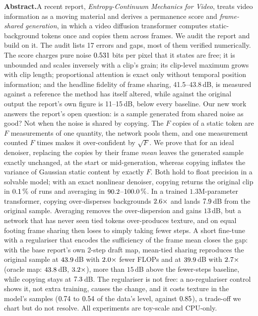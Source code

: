 \noindent\textbf{Abstract.}\hspace{0.4em}A recent report, \emph{Entropy-Continuum Mechanics for Video}, treats video information as a moving material and derives a permanence score and \emph{frame-shared generation}, in which a video diffusion transformer computes static-background tokens once and copies them across frames.
We audit the report and build on it.
The audit lists 17 errors and gaps, most of them verified numerically.
The score charges pure noise $0.531$ bits per pixel that it states are free; it is unbounded and scales inversely with a clip's grain; its clip-level maximum grows with clip length; proportional attention is exact only without temporal position information; and the headline fidelity of frame sharing, 41.5--43.8\,dB, is measured against a reference the method has itself altered, while against the original output the report's own figure is 11--15\,dB, below every baseline.
Our new work answers the report's open question: is a sample generated from shared noise as good?
Not when the noise is shared by copying.
The $F$ copies of a static token are $F$ measurements of one quantity, the network pools them, and one measurement counted $F$ times makes it over-confident by $\sqrt F$.
We prove that for an ideal denoiser, replacing the copies by their frame \emph{mean} leaves the generated sample exactly unchanged, at the start or mid-generation, whereas copying inflates the variance of Gaussian static content by exactly $F$.
Both hold to float precision in a solvable model; with an exact nonlinear denoiser, copying returns the original clip in $0.1\,\%$ of runs and averaging in $90.2$--$100.0\,\%$.
In a trained $1.3$M-parameter transformer, copying over-disperses backgrounds $2.6\times$ and lands $7.9$\,dB from the original sample.
Averaging removes the over-dispersion and gains $13$\,dB, but a network that has never seen tied tokens over-produces texture, and on equal footing frame sharing then loses to simply taking fewer steps.
A short fine-tune with a regulariser that encodes the sufficiency of the frame mean closes the gap: with the base report's own 2-step draft map, mean-tied sharing reproduces the original sample at $43.9$\,dB with $2.0\times$ fewer FLOPs and at $39.9$\,dB with $2.7\times$ (oracle map: $43.8$\,dB, $3.2\times$), more than $15$\,dB above the fewer-steps baseline, while copying stays at $7.3$\,dB.
The regulariser is not free: a no-regulariser control shows it, not extra training, causes the change, and it costs texture in the model's samples ($0.74$ to $0.54$ of the data's level, against $0.85$), a trade-off we chart but do not resolve.
All experiments are toy-scale and CPU-only.
